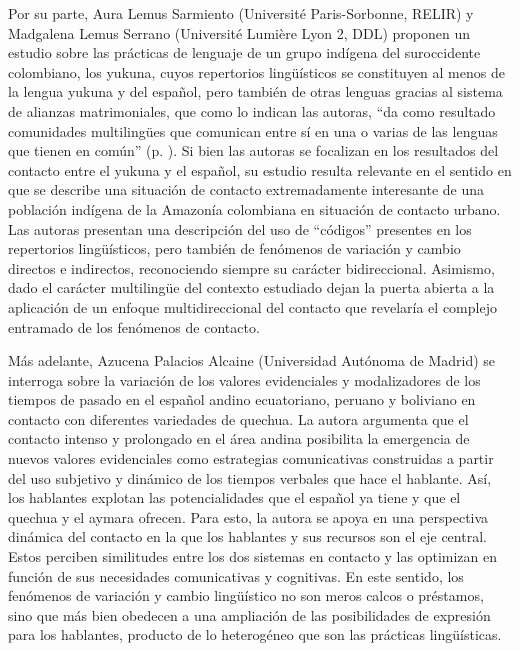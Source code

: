 \documentclass[output=paper]{langscibook}
\begin{document}
Por su parte, Aura Lemus Sarmiento (Université Paris-Sorbonne, RELIR) y Madgalena Lemus Serrano (Université Lumière Lyon 2, DDL) proponen un estudio sobre las prácticas de lenguaje de un grupo indígena del suroccidente colombiano, los yukuna, cuyos repertorios lingüísticos se constituyen al menos de la lengua yukuna y del español, pero también de otras lenguas gracias al sistema de alianzas matrimoniales, que como lo indican las autoras, “da como resultado comunidades multilingües que comunican entre sí en una o varias de las lenguas que tienen en común” (p. \pageref{lemus:quoteforintro}). Si bien las autoras se focalizan en los resultados del contacto entre el yukuna y el español, su estudio resulta relevante en el sentido en que se describe una situación de contacto extremadamente interesante de una población indígena de la Amazonía colombiana en situación de contacto urbano. Las autoras presentan una descripción del uso de “códigos” presentes en los repertorios lingüísticos, pero también de fenómenos de variación y cambio directos e indirectos, reconociendo siempre su carácter bidireccional. Asimismo, dado el carácter multilingüe del contexto estudiado dejan la puerta abierta a la aplicación de un enfoque multidireccional del contacto que revelaría el complejo entramado de los fenómenos de contacto. 

Más adelante, Azucena Palacios Alcaine (Universidad Autónoma de Madrid) se interroga sobre la variación de los valores evidenciales y modalizadores de los tiempos de pasado en el español andino ecuatoriano, peruano y boliviano en contacto con diferentes variedades de quechua. La autora argumenta que el contacto intenso y prolongado en el área andina posibilita la emergencia de nuevos valores evidenciales como estrategias comunicativas construidas a partir del uso subjetivo y dinámico de los tiempos verbales que hace el hablante. Así, los hablantes explotan las potencialidades que el español ya tiene y que el quechua y el aymara ofrecen. Para esto, la autora se apoya en una perspectiva dinámica del contacto en la que los hablantes y sus recursos son el eje central. Estos perciben similitudes entre los dos sistemas en contacto y las optimizan en función de sus necesidades comunicativas y cognitivas. En este sentido, los fenómenos de variación y cambio lingüístico no son meros calcos o préstamos, sino que más bien obedecen a una ampliación de las posibilidades de expresión para los hablantes, producto de lo heterogéneo que son las prácticas lingüísticas.
\end{document}
